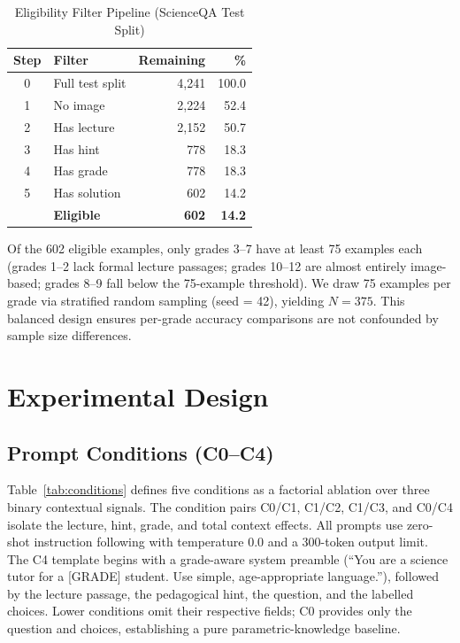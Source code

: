 \documentclass[journal]{IEEEtran}
\begin{document}
\begin{table}[h]
\centering
\caption{Eligibility Filter Pipeline (ScienceQA Test Split)}
\label{tab:filter}
\renewcommand{\arraystretch}{1.25}
\begin{tabular}{clrr}
\toprule
\textbf{Step} & \textbf{Filter} & \textbf{Remaining} & \textbf{\%} \\
\midrule
0 & Full test split   & 4,241 & 100.0 \\
\rowcolor{lightpurple}
1 & No image          & 2,224 &  52.4 \\
2 & Has lecture       & 2,152 &  50.7 \\
\rowcolor{lightpurple}
3 & Has hint          &   778 &  18.3 \\
4 & Has grade         &   778 &  18.3 \\
\rowcolor{lightpurple}
5 & Has solution      &   602 &  14.2 \\
\midrule
  & \textbf{Eligible} & \textbf{602} & \textbf{14.2} \\
\bottomrule
\end{tabular}
\end{table}

Of the 602 eligible examples, only grades 3--7 have at least 75 examples
each (grades 1--2 lack formal lecture passages; grades 10--12 are almost
entirely image-based; grades 8--9 fall below the 75-example threshold).
We draw 75 examples per grade via stratified random sampling (seed = 42),
yielding $N = 375$. This balanced design ensures per-grade accuracy
comparisons are not confounded by sample size differences.

\section{Experimental Design}
\label{sec:method}

\subsection{Prompt Conditions (C0--C4)}

Table~\ref{tab:conditions} defines five conditions as a factorial ablation
over three binary contextual signals. The condition pairs C0/C1, C1/C2,
C1/C3, and C0/C4 isolate the lecture, hint, grade, and total context
effects. All prompts use zero-shot instruction following with temperature
0.0 and a 300-token output limit. The C4 template begins with a grade-aware
system preamble (``You are a science tutor for a [GRADE] student. Use
simple, age-appropriate language.''), followed by the lecture passage,
the pedagogical hint, the question, and the labelled choices. Lower
conditions omit their respective fields; C0 provides only the question
and choices, establishing a pure parametric-knowledge baseline.
\end{document}
